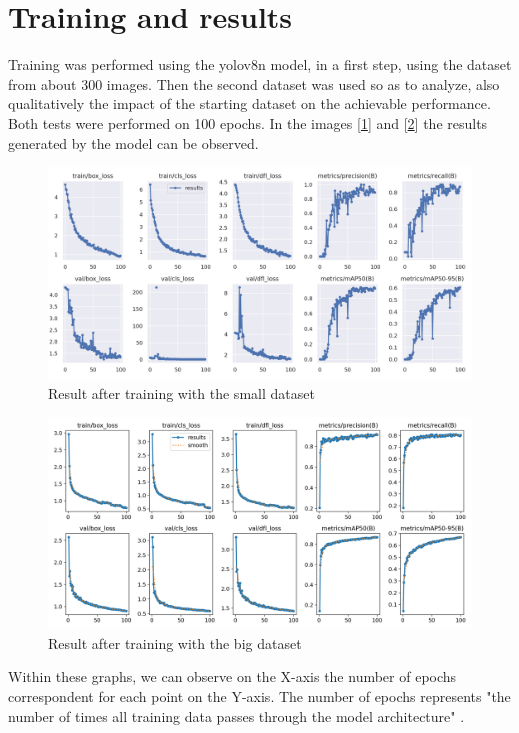 \documentclass[12pt]{article}
\begin{document}

\section{Training and results}
Training was performed using the yolov8n model, in a first step, using the dataset from about 300 images. Then the second dataset was used so as to analyze, also qualitatively the impact of the starting dataset on the achievable performance. Both tests were performed on 100 epochs. In the images [\ref{fig:mesh3}] and [\ref{fig:mesh4}] the results generated by the model can be observed.
\begin{figure}[H]
    \centering
    \includegraphics[width=0.8\linewidth]
    {results_training_small.png}
    \caption{Result after training with the small dataset \cite{carplate-xuk6s_dataset}}
    \label{fig:mesh3}
\end{figure}
\begin{figure}[H]
    \centering
    \includegraphics[width=0.8\linewidth]
    {results_training_big.png}
    \caption{Result after training with the big dataset \cite{tablice-73he1_dataset}}
    \label{fig:mesh4}
\end{figure}
Within these graphs, we can observe on the X-axis the number of epochs correspondent for each point on the Y-axis. The number of epochs represents "the number of times all training data passes through the model architecture" \cite{yolo2}.
\end{document}
